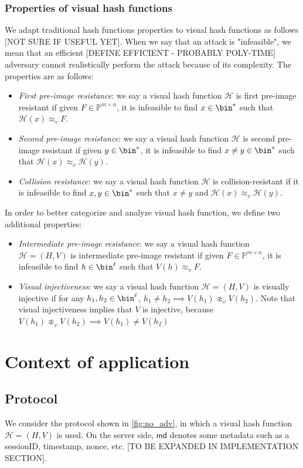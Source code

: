 \documentclass{article}
\newcommand{\bb}{\mathbb}
\newcommand{\vis}{\approx_v}
\newcommand{\pp}{\bb P}
\newcommand{\pmn}{\pp^{m \times n}}
\newcommand{\hh}{\mathcal H}
\begin{document}
\subsubsection{Properties of visual hash functions}
We adapt traditional hash functions properties to visual hash functions as follows [NOT SURE IF USEFUL YET]. When we say that an attack is "infeasible", we mean that an efficient [DEFINE EFFICIENT - PROBABLY POLY-TIME] adversary cannot realistically perform the attack because of its complexity. The properties are as follows:
\begin{itemize}
    \item \textit{First pre-image resistance}: we say a visual hash function $\mathcal H$ is first pre-image resistant if given $F \in \pmn$, it is infeasible to find $x \in \bin^*$ such that $\mathcal H(x) \vis F$.
    \item \textit{Second pre-image resistance}: we say a visual hash function $\mathcal H$ is second pre-image resistant if given $y \in \bin^*$, it is infeasible to find $x \neq y \in \bin ^*$ such that $\mathcal H(x) \vis \mathcal H(y)$.
    \item \textit{Collision resistance}: we say a visual hash function $\mathcal H$ is collision-resistant if it is infeasible to find $x, y \in \bin ^*$ such that $x \neq y$ and $\mathcal H(x) \vis \mathcal H(y)$.
\end{itemize}
In order to better categorize and analyze visual hash function, we define two additional properties:
\begin{itemize}
    \item \textit{Intermediate pre-image resistance}: we say a visual hash function $\mathcal H = (H, V)$ is intermediate pre-image resistant if given $F \in \pmn$, it is infeasible to find $h \in \bin^\ell$ such that $V(h) \vis F$.
    \item \textit{Visual injectiveness}: we say a visual hash function $\hh = (H,V)$ is visually injective if for any $h_1, h_2 \in \bin^\ell$, $h_1 \neq h_2 \implies V(h_1) \not\vis V(h_2)$. Note that visual injectiveness implies that $V$ is injective, because $V(h_1) \not\vis V(h_2) \implies V(h_1) \neq V(h_2)$
\end{itemize}
\section{Context of application}
\subsection{Protocol}
We consider the protocol shown in \cref{fig:no_adv}, in which a visual hash function $\hh = (H,V)$ is used. On the server side, $\mathsf{md}$ denotes some metadata such as a sessionID, timestamp, nonce, etc. [TO BE EXPANDED IN IMPLEMENTATION SECTION].
\end{document}
